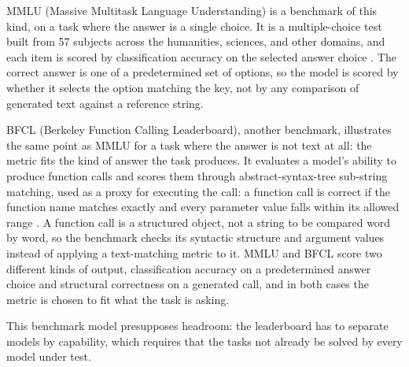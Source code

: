 MMLU (Massive Multitask Language Understanding) is a benchmark of this kind, on a task where the answer is a single choice. It is a multiple-choice test built from 57 subjects across the humanities, sciences, and other domains, and each item is scored by classification accuracy on the selected answer choice \cite{hendrycksMeasuringMassiveMultitask2021}. The correct answer is one of a predetermined set of options, so the model is scored by whether it selects the option matching the key, not by any comparison of generated text against a reference string.

BFCL (Berkeley Function Calling Leaderboard), another benchmark, illustrates the same point as MMLU for a task where the answer is not text at all: the metric fits the kind of answer the task produces. It evaluates a model's ability to produce function calls and scores them through abstract-syntax-tree sub-string matching, used as a proxy for executing the call: a function call is correct if the function name matches exactly and every parameter value falls within its allowed range \cite{patilBerkeleyFunctionCalling2025}. A function call is a structured object, not a string to be compared word by word, so the benchmark checks its syntactic structure and argument values instead of applying a text-matching metric to it. MMLU and BFCL score two different kinds of output, classification accuracy on a predetermined answer choice and structural correctness on a generated call, and in both cases the metric is chosen to fit what the task is asking.

This benchmark model presupposes headroom: the leaderboard has to separate models by capability, which requires that the tasks not already be solved by every model under test.
